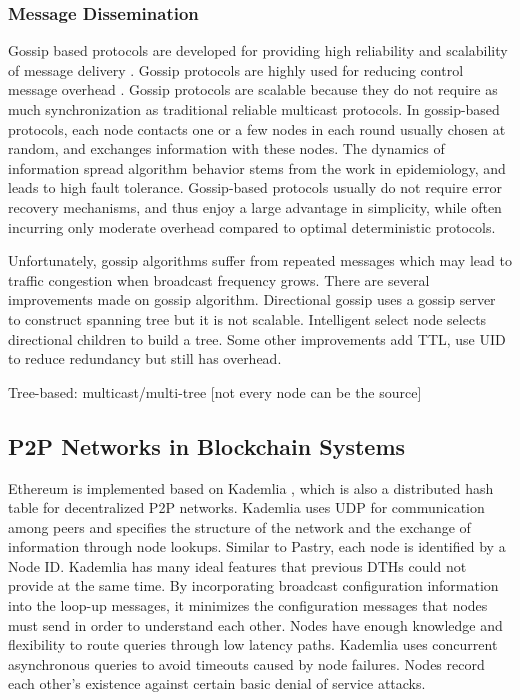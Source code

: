 \subsubsection{Message Dissemination}

Gossip based protocols are developed for providing high reliability and scalability of message delivery \cite{islam2009efficient}. Gossip protocols are highly used for reducing control message overhead \cite{gupta2002fighting}. Gossip protocols are scalable because they do not require as much synchronization as traditional reliable multicast protocols. In gossip-based protocols, each node contacts one or a few nodes in each round usually chosen at random, and exchanges information with these nodes. The dynamics of information spread algorithm behavior stems from the work in epidemiology, and leads to high fault tolerance. Gossip-based protocols usually do not require error recovery mechanisms, and thus enjoy a large advantage in simplicity, while often incurring only moderate overhead compared to optimal deterministic protocols.

Unfortunately, gossip algorithms suffer from repeated messages which may lead to traffic congestion when broadcast frequency grows. There are several improvements made on gossip algorithm. Directional gossip uses a gossip server to construct spanning tree but it is not scalable. Intelligent select node selects directional children to build a tree. Some other improvements add TTL, use UID to reduce redundancy but still has overhead.

Tree-based: multicast/multi-tree [not every node can be the source]

\subsection{P2P Networks in Blockchain Systems}

Ethereum is implemented based on Kademlia \cite{maymounkov2002kademlia}, which is also a distributed hash table for decentralized P2P networks. Kademlia uses UDP for communication among peers and specifies the structure of the network and the exchange of information through node lookups. Similar to Pastry, each node is identified by a Node ID. Kademlia has many ideal features that previous DTHs could not provide at the same time. By incorporating broadcast configuration information into the loop-up messages, it minimizes the configuration messages that nodes must send in order to understand each other. Nodes have enough knowledge and flexibility to route queries through low latency paths. Kademlia uses concurrent asynchronous queries to avoid timeouts caused by node failures. Nodes record each other's existence against certain basic denial of service attacks.

